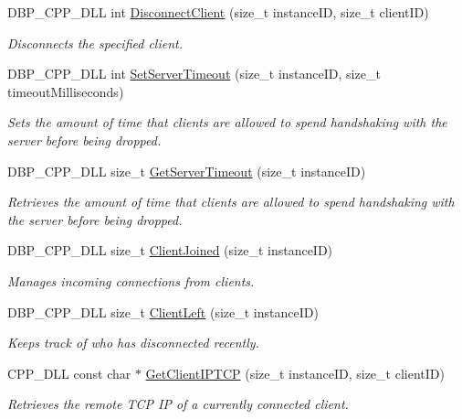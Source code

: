 \begin{DoxyCompactItemize}
DBP\_\-CPP\_\-DLL int \hyperlink{namespacemn_ae2c290babcdf8190d0502331f2799c93}{DisconnectClient} (size\_\-t instanceID, size\_\-t clientID)
\begin{DoxyCompactList}\small\item\em Disconnects the specified client. \item\end{DoxyCompactList}\item 
DBP\_\-CPP\_\-DLL int \hyperlink{namespacemn_a214c9fac7be21f994a50f11f6dbd1fd5}{SetServerTimeout} (size\_\-t instanceID, size\_\-t timeoutMilliseconds)
\begin{DoxyCompactList}\small\item\em Sets the amount of time that clients are allowed to spend handshaking with the server before being dropped. \item\end{DoxyCompactList}\item 
DBP\_\-CPP\_\-DLL size\_\-t \hyperlink{namespacemn_a90e71b91823a065bb587a82939edf97d}{GetServerTimeout} (size\_\-t instanceID)
\begin{DoxyCompactList}\small\item\em Retrieves the amount of time that clients are allowed to spend handshaking with the server before being dropped. \item\end{DoxyCompactList}\item 
DBP\_\-CPP\_\-DLL size\_\-t \hyperlink{namespacemn_aa88fef80cdb3574c2b6ba46931f8a133}{ClientJoined} (size\_\-t instanceID)
\begin{DoxyCompactList}\small\item\em Manages incoming connections from clients. \item\end{DoxyCompactList}\item 
DBP\_\-CPP\_\-DLL size\_\-t \hyperlink{namespacemn_a24fc1fbd520a0e0095810ad6fec20c5a}{ClientLeft} (size\_\-t instanceID)
\begin{DoxyCompactList}\small\item\em Keeps track of who has disconnected recently. \item\end{DoxyCompactList}\item 
CPP\_\-DLL const char $\ast$ \hyperlink{namespacemn_a796619854a3fa47f837e1a07dfea315f}{GetClientIPTCP} (size\_\-t instanceID, size\_\-t clientID)
\begin{DoxyCompactList}\small\item\em Retrieves the remote TCP IP of a currently connected client. \item\end{DoxyCompactList}\item 

\end{DoxyCompactItemize}
